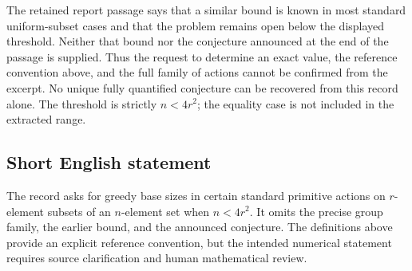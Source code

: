\documentclass[11pt]{article}
\begin{document}
The retained report passage says that a similar bound is known in most standard uniform-subset cases and that the problem remains open below the displayed threshold. Neither that bound nor the conjecture announced at the end of the passage is supplied. Thus the request to determine an exact value, the reference convention above, and the full family of actions cannot be confirmed from the excerpt. No unique fully quantified conjecture can be recovered from this record alone. The threshold is strictly \(n<4r^2\); the equality case is not included in the extracted range.
\subsection{Short English statement}
The record asks for greedy base sizes in certain standard primitive actions on \(r\)-element subsets of an \(n\)-element set when \(n<4r^2\). It omits the precise group family, the earlier bound, and the announced conjecture. The definitions above provide an explicit reference convention, but the intended numerical statement requires source clarification and human mathematical review.
\end{document}
